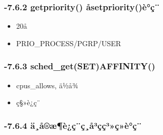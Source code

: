 \documentclass[11pt]{article}
\begin{document}
\subsubsection{-7.6.2 getpriority() åsetpriority()è°ç¨}
\label{sec-2.6.2}

\begin{itemize}
\item 20å
\item PRIO\_PROCESS/PGRP/USER
\end{itemize}
\subsubsection{-7.6.3 sched\_get(SET)AFFINITY()}
\label{sec-2.6.3}

\begin{itemize}
\item cpus\_allows, ä½å¾
\item ç§»è¿ç¨
\end{itemize}
\subsubsection{-7.6.4 ä¸å®æ¶è¿ç¨ç¸å³çç³»ç»è°ç¨}
\label{sec-2.6.4}
\end{document}
